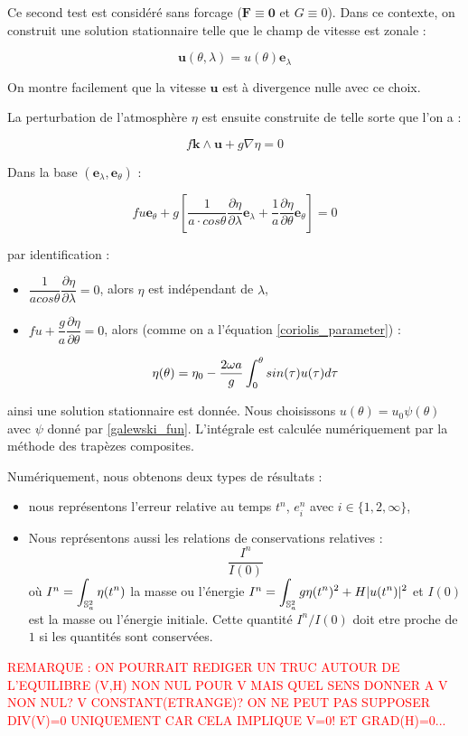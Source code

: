 Ce second test est considéré sans forcage ($\mathbf{F} \equiv \mathbf{0}$ et $G \equiv 0$). Dans ce contexte, on construit une solution stationnaire telle que le champ de vitesse est zonale :

$$\mathbf{u}(\theta, \lambda) = u(\theta) \mathbf{e}_{\lambda}$$

On montre facilement que la vitesse $ \mathbf{u}$ est à divergence nulle avec ce choix.

La perturbation de l'atmosphère $\eta$ est ensuite construite de telle sorte que l'on a :

\begin{equation}
f \mathbf{k} \wedge \mathbf{u} + g \nabla \eta = 0
\end{equation} 

Dans la base $(\mathbf{e}_{\lambda}, \mathbf{e}_{\theta})$ :

\begin{equation}
f u \mathbf{e}_{\theta} + g \left[ \dfrac{1}{a \cdot cos \theta} \dfrac{\partial \eta}{\partial \lambda} \mathbf{e}_{\lambda} + \dfrac{1}{a}\dfrac{\partial \eta}{\partial \theta} \mathbf{e}_{\theta} \right] = 0
\end{equation}

par identification :

\begin{itemize}
\item $\dfrac{1}{a cos \theta} \dfrac{\partial \eta}{\partial \lambda} = 0$, alors $\eta$ est indépendant de $\lambda$,

\item $f u + \dfrac{g}{a} \dfrac{\partial \eta}{\partial \theta} = 0$, alors (comme on a l'équation \eqref{coriolis_parameter}) :

\begin{equation}
\eta (\theta ) = \eta_0 - \dfrac{2 \omega a}{g} \displaystyle\int_0^{\theta} sin(\tau) u(\tau) d \tau
\end{equation} 
\end{itemize}

ainsi une solution stationnaire est donnée. Nous choisissons $u(\theta) = u_0 \psi( \theta )$ avec $\psi$ donné par \eqref{galewski_fun}. L'intégrale est calculée numériquement par la méthode des trapèzes composites.

Numériquement, nous obtenons deux types de résultats :
\begin{itemize}
\item nous représentons l'erreur relative au temps $t^n$, $e_i^n$ avec $i \in \lbrace 1, 2, \infty \rbrace$,
\item Nous représentons aussi les relations de conservations relatives :
\begin{equation}
\dfrac{I^n}{I(0)}
\end{equation}
où  $I^n = \displaystyle\int_{\mathbb{S}_a^2} \eta (t^n)$ la masse ou l'énergie $I^n = \displaystyle\int_{\mathbb{S}_a^2} g \eta (t^n)^2 + H |u(t^n) |^2$ et $I(0)$ est la masse ou l'énergie initiale. Cette quantité $I^n/I(0)$ doit etre proche de $1$ si les quantités sont conservées.
\end{itemize} 

\textcolor{red}{ REMARQUE : ON POURRAIT REDIGER UN TRUC AUTOUR DE L'EQUILIBRE (V,H) NON NUL POUR V MAIS QUEL SENS DONNER A V NON NUL? V CONSTANT(ETRANGE)?
ON NE PEUT PAS SUPPOSER DIV(V)=0 UNIQUEMENT CAR CELA IMPLIQUE V=0! ET GRAD(H)=0... }
